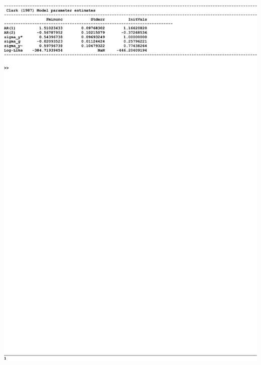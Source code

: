 \documentclass[a4paper,final,12pt]{article}
\begin{document}
\begin{table}[h!]
\centering
\includegraphics[width=.75\textwidth,trim={0 0 0 25},clip]{Clark_MLE.pdf} 
\vspace*{-2.5mm}
\caption{Clark (1987) model MLE parameter estimates for the U.S. from $1947$%
:Q2 to $2019$:Q4.}
\label{tab:MLE}
\end{table}
\end{document}
